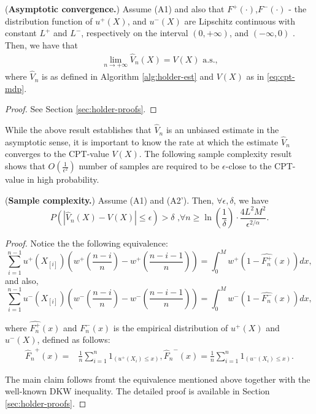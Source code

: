 \documentclass[11pt,letterpaper,english]{article}
\begin{document}
\begin{proposition}(\textbf{Asymptotic convergence.})
\label{prop:holder-asymptotic}
Assume (A1) and also that $F^+(\cdot)$,$F^-(\cdot)$ - the distribution function of $u^+(X)$, and $u^-(X)$ are Lipschitz continuous with constant $L^+$ and $L^-$, respectively on the interval $(0,+\infty)$, and 
$(-\infty, 0)$ . Then, we have that
\begin{align}
\lim_{n\rightarrow +\infty} 
\hat V_n(X)
=
V(X)
 \text{   a.s.,}
\end{align}
where $\hat V_n$ is as defined in Algorithm \ref{alg:holder-est} and $V(X)$ as in \eqref{eq:cpt-mdp}.
\end{proposition}
\begin{proof}
See Section \ref{sec:holder-proofs}.
\end{proof}

While the above result establishes that $\hat V_n$ is an unbiased estimate in the asymptotic sense, it is important to know the rate at which the estimate $\hat V_n$ converges to the CPT-value $V(X)$. 
The following sample complexity result shows that $O\left(\frac{1}{\epsilon^2}\right)$ number of samples are required to be $\epsilon$-close to the CPT-value in high probability.

% 

\begin{proposition}(\textbf{Sample complexity.})
\label{prop:holder-dkw}
Assume (A1) and (A2'). Then, $\forall \epsilon, \delta$, we have
$$
P(\left |\hat V_n(X)- V(X) \right| \leq  \epsilon ) > \delta\text{     ,} \forall n \geq \ln(\frac{1}{\delta})\cdot 
\frac{4L^2 M^2}{\epsilon^{2/\alpha}}.$$
\end{proposition}
\begin{proof}
Notice the the following equivalence:
$$\sum_{i=1}^{n-1} u^+(X_{[i]}) (w^+(\frac{n-i}{n}) - w^+(\frac{n-i-1}{n})) =  \int_0^M w^+(1-\hat{F^+_n}(x)) dx, $$
and also,
$$\sum_{i=1}^{n-1} u^-(X_{[i]}) (w^-(\frac{n-i}{n}) - w^-(\frac{n-i-1}{n})) =  \int_0^M w^-(1-\hat{F^-_n}(x)) dx, $$

where $\hat{F^+_n}(x)$ and $\hat{F^-_n}(x)$ is the empirical distribution of $u^+(X)$
and $u^-(X)$, defined as follows:
\begin{align}
{\hat F_n}^+(x)=&\frac{1}{n} \sum_{i=1}^n 1_{(u^+(X_i) \leq x)}, 
{\hat F_n}^-(x)=\frac{1}{n} \sum_{i=1}^n 1_{(u^-(X_i) \leq x)}.
\label{eq:edf}
\end{align}

The main claim follows fromt the equivalence mentioned above together with the well-known DKW inequality.
The detailed proof is available in Section \ref{sec:holder-proofs}.
\end{proof}
\end{document}
